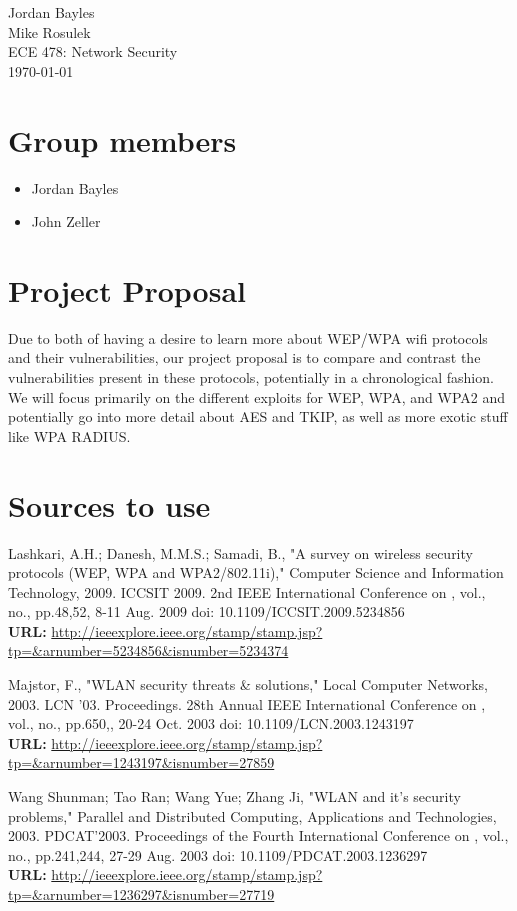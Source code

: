 \documentclass[12pt]{article}
\newcommand{\bibent}{\noindent \hangindent 40pt}
\newenvironment{sources}{}{}
\begin{document}
\begin{flushleft}

Jordan Bayles\\
Mike Rosulek\\
ECE 478: Network Security\\
\today\\

\setlength{\parindent}{0.5in}

\section{Group members}
\begin{itemize}
	\item Jordan Bayles
	\item John Zeller
\end{itemize}

\section{Project Proposal}
Due to both of having a desire to learn more about WEP/WPA wifi
protocols and their vulnerabilities, our project proposal is
to compare and contrast the vulnerabilities present in these
protocols, potentially in a chronological fashion. We will focus
primarily on the different exploits for WEP, WPA, and WPA2 and
potentially go into more detail about AES and TKIP, as well
as more exotic stuff like WPA RADIUS.

\section{Sources to use}
\begin{sources}
\bibent
Lashkari, A.H.; Danesh, M.M.S.; Samadi, B., "A survey on wireless security protocols (WEP, WPA and WPA2/802.11i)," Computer Science and Information Technology, 2009. ICCSIT 2009. 2nd IEEE International Conference on , vol., no., pp.48,52, 8-11 Aug. 2009
doi: 10.1109/ICCSIT.2009.5234856
\\\textbf{URL:} \url{http://ieeexplore.ieee.org/stamp/stamp.jsp?tp=&arnumber=5234856&isnumber=5234374}

\bibent
Majstor, F., "WLAN security threats \& solutions," Local Computer Networks, 2003. LCN '03. Proceedings. 28th Annual IEEE International Conference on , vol., no., pp.650,, 20-24 Oct. 2003
doi: 10.1109/LCN.2003.1243197
\\\textbf{URL:} \url{http://ieeexplore.ieee.org/stamp/stamp.jsp?tp=&arnumber=1243197&isnumber=27859}

\bibent
Wang Shunman; Tao Ran; Wang Yue; Zhang Ji, "WLAN and it's security problems," Parallel and Distributed Computing, Applications and Technologies, 2003. PDCAT'2003. Proceedings of the Fourth International Conference on , vol., no., pp.241,244, 27-29 Aug. 2003
doi: 10.1109/PDCAT.2003.1236297
\\\textbf{URL:} \url{http://ieeexplore.ieee.org/stamp/stamp.jsp?tp=&arnumber=1236297&isnumber=27719}

\end{sources}
\end{flushleft}
\end{document}
